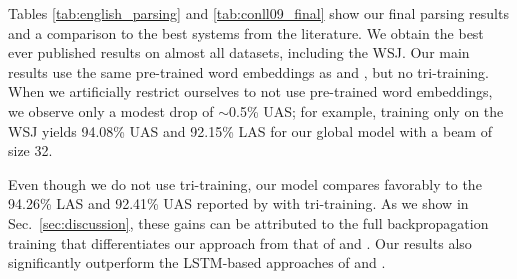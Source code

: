 Tables \ref{tab:english_parsing} and \ref{tab:conll09_final} show
our final parsing results and a comparison to the best systems from the literature.
We obtain the best ever published results on almost all datasets, including the WSJ.
Our main results use the same pre-trained word embeddings
as  and , but no tri-training.
When we artificially restrict ourselves to not use pre-trained word embeddings, 
we observe only a modest drop of $\sim$0.5\% UAS;
for example, training only on the WSJ yields 94.08\% UAS and 92.15\% LAS 
for our global model with a beam of size 32.

Even though we do not use tri-training, our model compares favorably to the 94.26\% LAS and 92.41\% UAS
reported by  with tri-training.
As we show in Sec.~\ref{sec:discussion}, these gains can be attributed to the full backpropagation
training that differentiates our approach from that of 
and .
Our results also significantly outperform the LSTM-based approaches of
 and .

